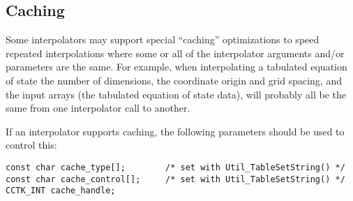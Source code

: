 


\subsection{Caching}
\label{sect-generic-options/caching}

Some interpolators may support special ``caching'' optimizations to
speed repeated interpolations where some or all of the interpolator
arguments and/or parameters are the same.  For example, when interpolating
a tabulated equation of state the number of dimensions, the coordinate
origin and grid spacing, and the input arrays (the tabulated equation
of state data), will probably all be the same from one interpolator
call to another.

If an interpolator supports caching, the following parameters should
be used to control this:

\begin{verbatim}
const char cache_type[];        /* set with Util_TableSetString() */
const char cache_control[];     /* set with Util_TableSetString() */
CCTK_INT cache_handle;
\end{verbatim}

